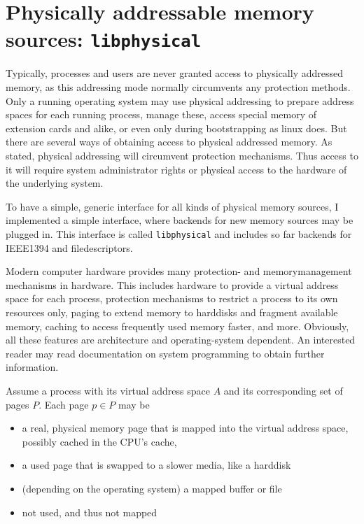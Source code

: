 %
%

\section{Physically addressable memory sources: \texttt{libphysical}}

Typically, processes and users are never granted access to physically addressed
memory, as this addressing mode normally circumvents any protection methods.
Only a running operating system may use physical addressing to prepare address
spaces for each running process, manage these, access special memory of
extension cards and alike, or even only during bootstrapping as linux does. But
there are several ways of obtaining access to physical addressed memory. As
stated, physical addressing will circumvent protection mechanisms. Thus access
to it will require system administrator rights or physical access to the
hardware of the underlying system.

To have a simple, generic interface for all kinds of physical memory sources, I
implemented a simple interface, where backends for new memory sources may be
plugged in. This interface is called \texttt{libphysical} and includes so far
backends for IEEE1394 and filedescriptors.

Modern computer hardware provides many protection- and memorymanagement
mechanisms in hardware. This includes hardware to provide a virtual address
space for each process, protection mechanisms to restrict a process to its own
resources only, paging to extend memory to harddisks and fragment available
memory, caching to access frequently used memory faster, and more. Obviously,
all these features are architecture and operating-system dependent. An
interested reader may read documentation on system programming to obtain further
information.

Assume a process with its virtual address space $A$ and its corresponding set of
pages $P$. Each page $p \in P$ may be

\begin{itemize}

	\item a real, physical memory page that is mapped into the virtual 
		address space, possibly cached in the CPU's cache,

	\item a used page that is swapped to a slower media, like a harddisk

	\item (depending on the operating system) a mapped buffer or file

	\item not used, and thus not mapped

\end{itemize}

